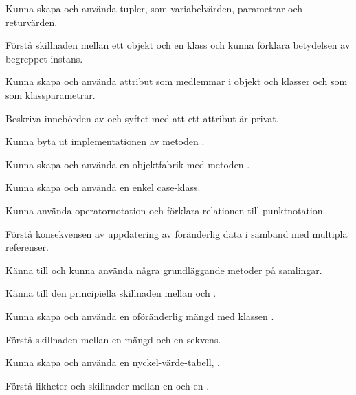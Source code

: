 
\Exercise{\ExeWeekFOUR}\label{exe:W04}

\begin{Goals}
\item Kunna skapa och använda tupler, som variabelvärden, parametrar och returvärden.

\item Förstå skillnaden mellan ett objekt och en klass och kunna förklara betydelsen av begreppet instans.

\item Kunna skapa och använda attribut som medlemmar i objekt och klasser och som som klassparametrar.

\item Beskriva innebörden av och syftet med att ett attribut är privat.

\item Kunna byta ut implementationen av metoden .

\item Kunna skapa och använda en objektfabrik med metoden .

\item Kunna skapa och använda en enkel case-klass.

\item Kunna använda operatornotation och förklara relationen till punktnotation.

\item Förstå konsekvensen av uppdatering av föränderlig data i samband med multipla referenser.

\item Känna till och kunna använda några grundläggande metoder på samlingar.

\item Känna till den principiella skillnaden mellan  och .

\item Kunna skapa och använda en oföränderlig mängd med klassen .

\item Förstå skillnaden mellan en mängd och en sekvens.

\item Kunna skapa och använda en nyckel-värde-tabell, .

\item Förstå likheter och skillnader mellan en  och en .
\end{Goals}


